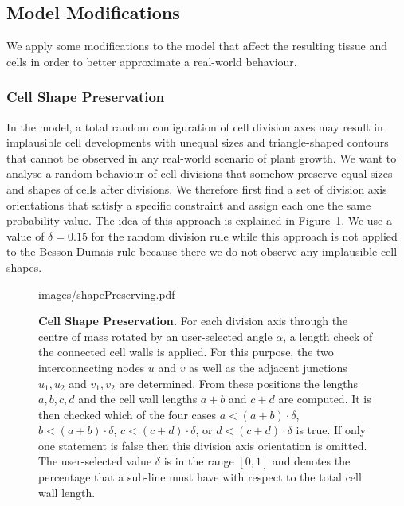 \documentclass[11pt,a4paper, final]{article}
\begin{document}
\subsection{Model Modifications}
We apply some modifications to the model that affect the resulting tissue and cells in order to better approximate a real-world behaviour.
\subsubsection{Cell Shape Preservation}
\label{sec:cellShape}
\noindent
In the model, a total random configuration of cell division axes may result in implausible cell developments with unequal sizes and triangle-shaped contours that cannot be observed in any real-world scenario of plant growth. We want to analyse a random behaviour of cell divisions that somehow preserve equal sizes and shapes of cells after divisions. We therefore first find a set of division axis orientations that satisfy a specific constraint and assign each one the same probability value. The idea of this approach is explained in Figure~\ref{fig:shapePreserving}. We use a value of $\delta = 0.15$ for the random division rule while this approach is not applied to the Besson-Dumais rule because there we do not observe any implausible cell shapes.
%
\begin{figure}[htbp]
	\begin{center}
		\begin{overpic}[width=0.7\linewidth]{images/shapePreserving.pdf}
		\end{overpic}
\caption[]
{
{\bf Cell Shape Preservation.} For each division axis through the centre of mass rotated by an user-selected angle $\alpha$, a length check of the connected cell walls is applied. For this purpose, the two interconnecting nodes $u$ and $v$ as well as the adjacent junctions $u_1, u_2$ and $v_1, v_2$ are determined. From these positions the lengths $a, b, c, d$ and the cell wall lengths $a+b$ and $c+d$ are computed. It is then checked which of the four cases $a < (a+b)\cdot \delta$, $b < (a+b)\cdot \delta$, $c < (c+d)\cdot \delta$, or $d < (c+d)\cdot \delta$ is true. If only one statement is false then this division axis orientation is omitted. The user-selected value $\delta$ is in the range $[0,1]$ and denotes the percentage that a sub-line must have with respect to the total cell wall length.
}
	\label{fig:shapePreserving}
	\end{center}
\end{figure}
%
\end{document}
